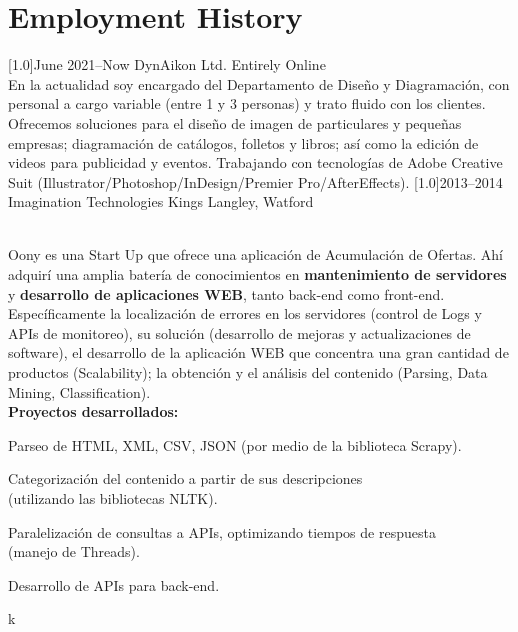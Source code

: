\documentclass[]{cv-style}     %
\begin{document}
\section{Employment History}
  \vspace{-0.2cm}
\begin{entrylist}
\entry
  {\scalebox{.8}[1.0]{June 2021--Now}}
  {DynAikon Ltd.}
  {Entirely Online}
  {\\
  En la actualidad soy encargado del Departamento de Diseño y Diagramación, con personal a cargo variable (entre 1 y 3 personas) y trato fluido con los clientes. Ofrecemos soluciones para el diseño de imagen de particulares y pequeñas empresas; diagramación de catálogos, folletos y libros; así como la edición de videos para publicidad y eventos. Trabajando con tecnologías de Adobe Creative Suit (Illustrator/Photoshop/InDesign/Premier Pro/AfterEffects).}
\vspace{-0.3cm}
\entry
  {\scalebox{.8}[1.0]{2013--2014}}
  {Imagination Technologies}
  {Kings Langley, Watford}
  {\\
  Oony es una Start Up que ofrece una aplicación de Acumulación de Ofertas. Ahí adquirí una amplia batería de conocimientos en \textbf{mantenimiento de servidores} y \textbf{desarrollo de aplicaciones WEB}, tanto back-end como front-end. Específicamente la localización de errores en los servidores (control de Logs y APIs de monitoreo), su solución (desarrollo de mejoras y actualizaciones de software), el desarrollo de la aplicación WEB que concentra una gran cantidad de productos (Scalability); la obtención y el análisis del contenido (Parsing, Data Mining, Classification).\\
  \textbf{Proyectos desarrollados:}
  \begin{itemize}\small{
    \item Parseo de HTML, XML, CSV, JSON (por medio de la biblioteca Scrapy).
    \item Categorización del contenido a partir de sus descripciones\\
    (utilizando las bibliotecas NLTK).
    \item Paralelización de consultas a APIs, optimizando tiempos de respuesta\\
    (manejo de Threads).
    \item Desarrollo de APIs para back-end.}
k  \end{itemize}}
\end{entrylist}
\end{document}
